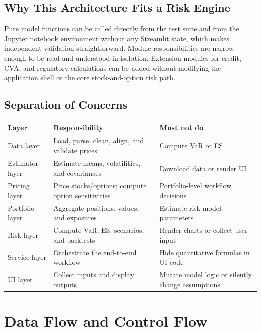 \documentclass[11pt]{article}
\begin{document}
\subsection{Why This Architecture Fits a Risk Engine}

Pure model functions can be called directly from the test suite and from
the Jupyter notebook environment without any Streamlit state, which makes
independent validation straightforward.  Module responsibilities are
narrow enough to be read and understood in isolation.  Extension modules
for credit, CVA, and regulatory calculations can be added without
modifying the application shell or the core stock-and-option risk path.

\subsection{Separation of Concerns}

\begin{center}
\begin{tabular}{L{2.5cm}L{5.5cm}L{5.5cm}}
\toprule
\textbf{Layer} & \textbf{Responsibility} & \textbf{Must not do} \\
\midrule
Data layer      & Load, parse, clean, align, and validate prices & Compute VaR or ES \\
Estimator layer & Estimate means, volatilities, and covariances & Download data or render UI \\
Pricing layer   & Price stocks/options; compute option sensitivities & Portfolio-level workflow decisions \\
Portfolio layer & Aggregate positions, values, and exposures & Estimate risk-model parameters \\
Risk layer      & Compute VaR, ES, scenarios, and backtests & Render charts or collect user input \\
Service layer   & Orchestrate the end-to-end workflow & Hide quantitative formulas in UI code \\
UI layer        & Collect inputs and display outputs & Mutate model logic or silently change assumptions \\
\bottomrule
\end{tabular}
\end{center}

\section{Data Flow and Control Flow}
\end{document}
